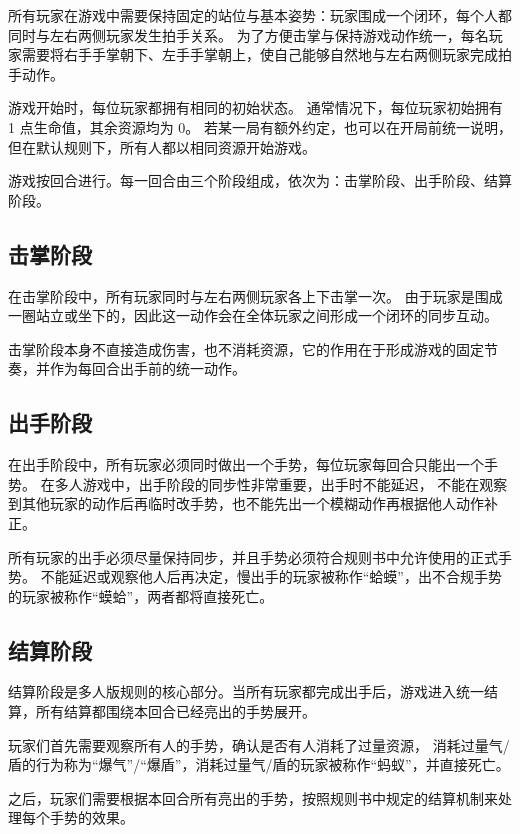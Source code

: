 \documentclass[12pt]{ctexart}
\begin{document}
所有玩家在游戏中需要保持固定的站位与基本姿势：玩家围成一个闭环，每个人都同时与左右两侧玩家发生拍手关系。
为了方便击掌与保持游戏动作统一，每名玩家需要将右手手掌朝下、左手手掌朝上，使自己能够自然地与左右两侧玩家完成拍手动作。

游戏开始时，每位玩家都拥有相同的初始状态。
通常情况下，每位玩家初始拥有 1 点生命值，其余资源均为 0。
若某一局有额外约定，也可以在开局前统一说明，但在默认规则下，所有人都以相同资源开始游戏。

游戏按回合进行。每一回合由三个阶段组成，依次为：击掌阶段、出手阶段、结算阶段。

\subsection{击掌阶段}

在击掌阶段中，所有玩家同时与左右两侧玩家各上下击掌一次。
由于玩家是围成一圈站立或坐下的，因此这一动作会在全体玩家之间形成一个闭环的同步互动。

击掌阶段本身不直接造成伤害，也不消耗资源，它的作用在于形成游戏的固定节奏，并作为每回合出手前的统一动作。

\subsection{出手阶段}

在出手阶段中，所有玩家必须同时做出一个手势，每位玩家每回合只能出一个手势。
在多人游戏中，出手阶段的同步性非常重要，出手时不能延迟，
不能在观察到其他玩家的动作后再临时改手势，也不能先出一个模糊动作再根据他人动作补正。

所有玩家的出手必须尽量保持同步，并且手势必须符合规则书中允许使用的正式手势。
不能延迟或观察他人后再决定，慢出手的玩家被称作“蛤蟆”，出不合规手势的玩家被称作“蟆蛤”，两者都将直接死亡。

\subsection{结算阶段}

结算阶段是多人版规则的核心部分。当所有玩家都完成出手后，游戏进入统一结算，所有结算都围绕本回合已经亮出的手势展开。

玩家们首先需要观察所有人的手势，确认是否有人消耗了过量资源，
消耗过量气/盾的行为称为“爆气”/“爆盾”，消耗过量气/盾的玩家被称作“蚂蚁”，并直接死亡。

之后，玩家们需要根据本回合所有亮出的手势，按照规则书中规定的结算机制来处理每个手势的效果。

\end{document}
